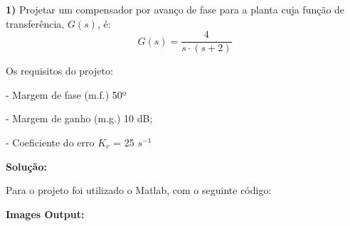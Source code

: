 \documentclass{layout}
\begin{document}
\printtitle

\noindent \textbf{1)} Projetar um compensador por avanço de fase para a planta cuja função de transferência, $G(s)$, é:
\[ G(s) = \dfrac{4}{s\cdot (s+2)}\]

\noindent Os requisitos do projeto: 

- Margem de fase (m.f.) 50º 

- Margem de ganho (m.g.) 10 dB; 

- Coeficiente do erro $K_v$ = 25 $s^{-1}$ 

\color{Red}
\noindent \textbf{Solução:}


\color{Black}
Para o projeto foi utilizado o Matlab, com o seguinte código:



\noindent \textbf{Images Output:}
\end{document}
